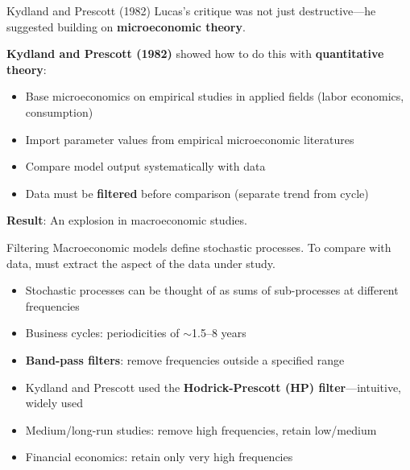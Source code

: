 \documentclass[blue]{beamer}
\begin{document}
\begin{frame}{Kydland and Prescott (1982)}
	Lucas's critique was not just destructive---he suggested building on \textbf{microeconomic theory}.
	
	\bigskip
	\textbf{Kydland and Prescott (1982)} showed how to do this with \textbf{quantitative theory}:
	\begin{itemize}
		\item Base microeconomics on empirical studies in applied fields (labor economics, consumption)
		\item Import parameter values from empirical microeconomic literatures
		\item Compare model output systematically with data
		\item Data must be \textbf{filtered} before comparison (separate trend from cycle)
	\end{itemize}
	
	\bigskip
	\textbf{Result}: An explosion in macroeconomic studies.
\end{frame}
\begin{frame}{Filtering}
	Macroeconomic models define stochastic processes. To compare with data, must extract the aspect of the data under study.
	
	\bigskip
	\begin{itemize}
		\item Stochastic processes can be thought of as sums of sub-processes at different frequencies
		\item Business cycles: periodicities of $\sim$1.5--8 years
		\item \textbf{Band-pass filters}: remove frequencies outside a specified range
		\item Kydland and Prescott used the \textbf{Hodrick-Prescott (HP) filter}---intuitive, widely used
		\item Medium/long-run studies: remove high frequencies, retain low/medium
		\item Financial economics: retain only very high frequencies
	\end{itemize}
\end{frame}
\end{document}
